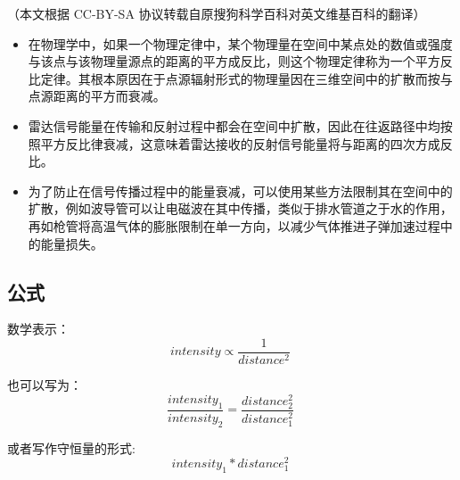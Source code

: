 
（本文根据 CC-BY-SA 协议转载自原搜狗科学百科对英文维基百科的翻译）
\begin{itemize}
\item 在物理学中，如果一个物理定律中，某个物理量在空间中某点处的数值或强度与该点与该物理量源点的距离的平方成反比，则这个物理定律称为一个平方反比定律。其根本原因在于点源辐射形式的物理量因在三维空间中的扩散而按与点源距离的平方而衰减。
\item 雷达信号能量在传输和反射过程中都会在空间中扩散，因此在往返路径中均按照平方反比律衰减，这意味着雷达接收的反射信号能量将与距离的四次方成反比。
\item 为了防止在信号传播过程中的能量衰减，可以使用某些方法限制其在空间中的扩散，例如波导管可以让电磁波在其中传播，类似于排水管道之于水的作用，再如枪管将高温气体的膨胀限制在单一方向，以减少气体推进子弹加速过程中的能量损失。
\end{itemize}
\subsection{公式}
数学表示：
\begin{equation}
intensity \propto \frac{1}{distance^2}~
\end{equation}

也可以写为：\begin{equation}
\frac{intensity_1}{intensity_2}=\frac{distance_2^2}{distance_1^2}~ 
\end{equation}

或者写作守恒量的形式:\begin{equation}
intensity_1 * distance_1^2~
\end{equation}
